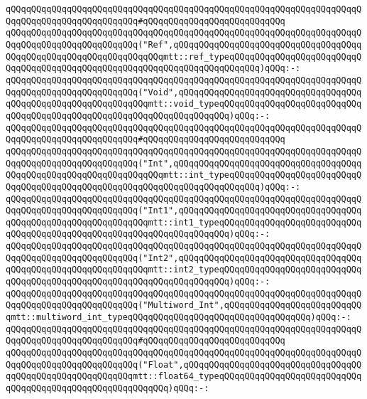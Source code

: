 \verb|qQQqqQQqqQQqqQQqqQQqqQQqqQQqqQQqqQQqqQQqqQQqqQQqqQQqqQQqqQQqqQQqqQQqqQQqqQQqqQQqqQQqqQQqqQQqqQQq#qQQqqQQqqQQqqQQqqQQqqQQqqQQq|\newline
\verb|qQQqqQQqqQQqqQQqqQQqqQQqqQQqqQQqqQQqqQQqqQQqqQQqqQQqqQQqqQQqqQQqqQQqqQQqqQQqqQQqqQQqqQQqqQQqqQQq("Ref",qQQqqQQqqQQqqQQqqQQqqQQqqQQqqQQqqQQqqQQqqQQqqQQqqQQqqQQqqQQqqQQqqQQqmtt::ref_typeqQQqqQQqqQQqqQQqqQQqqQQqqQQqqQQqqQQqqQQqqQQqqQQqqQQqqQQqqQQqqQQqqQQqqQQqqQQq)qQQq:-:|\newline
\verb|qQQqqQQqqQQqqQQqqQQqqQQqqQQqqQQqqQQqqQQqqQQqqQQqqQQqqQQqqQQqqQQqqQQqqQQqqQQqqQQqqQQqqQQqqQQqqQQq("Void",qQQqqQQqqQQqqQQqqQQqqQQqqQQqqQQqqQQqqQQqqQQqqQQqqQQqqQQqqQQqqQQqmtt::void_typeqQQqqQQqqQQqqQQqqQQqqQQqqQQqqQQqqQQqqQQqqQQqqQQqqQQqqQQqqQQqqQQqqQQqqQQq)qQQq:-:|\newline
\verb|qQQqqQQqqQQqqQQqqQQqqQQqqQQqqQQqqQQqqQQqqQQqqQQqqQQqqQQqqQQqqQQqqQQqqQQqqQQqqQQqqQQqqQQqqQQqqQQq#qQQqqQQqqQQqqQQqqQQqqQQqqQQq|\newline
\verb|qQQqqQQqqQQqqQQqqQQqqQQqqQQqqQQqqQQqqQQqqQQqqQQqqQQqqQQqqQQqqQQqqQQqqQQqqQQqqQQqqQQqqQQqqQQqqQQq("Int",qQQqqQQqqQQqqQQqqQQqqQQqqQQqqQQqqQQqqQQqqQQqqQQqqQQqqQQqqQQqqQQqqQQqmtt::int_typeqQQqqQQqqQQqqQQqqQQqqQQqqQQqqQQqqQQqqQQqqQQqqQQqqQQqqQQqqQQqqQQqqQQqqQQqqQQq)qQQq:-:|\newline
\verb|qQQqqQQqqQQqqQQqqQQqqQQqqQQqqQQqqQQqqQQqqQQqqQQqqQQqqQQqqQQqqQQqqQQqqQQqqQQqqQQqqQQqqQQqqQQqqQQq("Int1",qQQqqQQqqQQqqQQqqQQqqQQqqQQqqQQqqQQqqQQqqQQqqQQqqQQqqQQqqQQqqQQqmtt::int1_typeqQQqqQQqqQQqqQQqqQQqqQQqqQQqqQQqqQQqqQQqqQQqqQQqqQQqqQQqqQQqqQQqqQQqqQQq)qQQq:-:|\newline
\verb|qQQqqQQqqQQqqQQqqQQqqQQqqQQqqQQqqQQqqQQqqQQqqQQqqQQqqQQqqQQqqQQqqQQqqQQqqQQqqQQqqQQqqQQqqQQqqQQq("Int2",qQQqqQQqqQQqqQQqqQQqqQQqqQQqqQQqqQQqqQQqqQQqqQQqqQQqqQQqqQQqqQQqmtt::int2_typeqQQqqQQqqQQqqQQqqQQqqQQqqQQqqQQqqQQqqQQqqQQqqQQqqQQqqQQqqQQqqQQqqQQqqQQq)qQQq:-:|\newline
\verb|qQQqqQQqqQQqqQQqqQQqqQQqqQQqqQQqqQQqqQQqqQQqqQQqqQQqqQQqqQQqqQQqqQQqqQQqqQQqqQQqqQQqqQQqqQQqqQQq("Multiword_Int",qQQqqQQqqQQqqQQqqQQqqQQqqQQqmtt::multiword_int_typeqQQqqQQqqQQqqQQqqQQqqQQqqQQqqQQqqQQq)qQQq:-:|\newline
\verb|qQQqqQQqqQQqqQQqqQQqqQQqqQQqqQQqqQQqqQQqqQQqqQQqqQQqqQQqqQQqqQQqqQQqqQQqqQQqqQQqqQQqqQQqqQQqqQQq#qQQqqQQqqQQqqQQqqQQqqQQqqQQq|\newline
\verb|qQQqqQQqqQQqqQQqqQQqqQQqqQQqqQQqqQQqqQQqqQQqqQQqqQQqqQQqqQQqqQQqqQQqqQQqqQQqqQQqqQQqqQQqqQQqqQQq("Float",qQQqqQQqqQQqqQQqqQQqqQQqqQQqqQQqqQQqqQQqqQQqqQQqqQQqqQQqqQQqmtt::float64_typeqQQqqQQqqQQqqQQqqQQqqQQqqQQqqQQqqQQqqQQqqQQqqQQqqQQqqQQqqQQq)qQQq:-:|\newline
